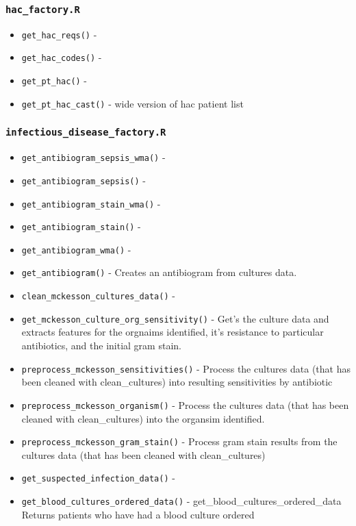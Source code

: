 \documentclass[
]{book}
\providecommand{\tightlist}{%
  \setlength{\itemsep}{0pt}\setlength{\parskip}{0pt}}
\begin{document}
\hypertarget{hac_factory.r}{%
\subsubsection{\texorpdfstring{\texttt{hac\_factory.R}}{hac\_factory.R}}\label{hac_factory.r}}

\begin{itemize}
\tightlist
\item
  \texttt{get\_hac\_reqs()} -
\item
  \texttt{get\_hac\_codes()} -
\item
  \texttt{get\_pt\_hac()} -
\item
  \texttt{get\_pt\_hac\_cast()} - wide version of hac patient list
\end{itemize}

\hypertarget{infectious_disease_factory.r}{%
\subsubsection{\texorpdfstring{\texttt{infectious\_disease\_factory.R}}{infectious\_disease\_factory.R}}\label{infectious_disease_factory.r}}

\begin{itemize}
\tightlist
\item
  \texttt{get\_antibiogram\_sepsis\_wma()} -
\item
  \texttt{get\_antibiogram\_sepsis()} -
\item
  \texttt{get\_antibiogram\_stain\_wma()} -
\item
  \texttt{get\_antibiogram\_stain()} -
\item
  \texttt{get\_antibiogram\_wma()} -
\item
  \texttt{get\_antibiogram()} - Creates an antibiogram from cultures data.
\item
  \texttt{clean\_mckesson\_cultures\_data()} -
\item
  \texttt{get\_mckesson\_culture\_org\_sensitivity()} - Get's the culture data and extracts features for the orgnaims identified, it's resistance to particular antibiotics, and the initial gram stain.
\item
  \texttt{preprocess\_mckesson\_sensitivities()} - Process the cultures data (that has been cleaned with clean\_cultures) into resulting sensitivities by antibiotic
\item
  \texttt{preprocess\_mckesson\_organism()} - Process the cultures data (that has been cleaned with clean\_cultures) into the organsim identified.
\item
  \texttt{preprocess\_mckesson\_gram\_stain()} - Process gram stain results from the cultures data (that has been cleaned with clean\_cultures)
\item
  \texttt{get\_suspected\_infection\_data()} -
\item
  \texttt{get\_blood\_cultures\_ordered\_data()} - get\_blood\_cultures\_ordered\_data Returns patients who have had a blood culture ordered
\end{itemize}
\end{document}
